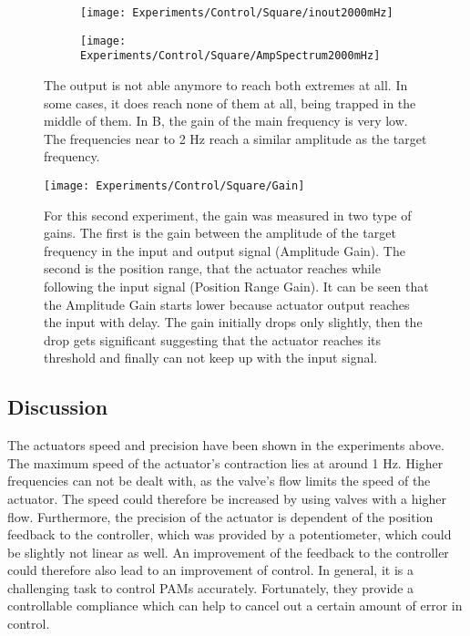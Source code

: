 \documentclass[main]{subfiles}
\begin{document}
\begin{figure}[H]
\begin{adjustwidth}{-8em}{-3em}
\begin{subfigure}[t]{0.665\textwidth}
\texttt{[image: Experiments/Control/Square/inout2000mHz]}
\end{subfigure}\hspace{0.05\textwidth}
\begin{subfigure}[t]{0.6\textwidth}
\texttt{[image: Experiments/Control/Square/AmpSpectrum2000mHz]}
\end{subfigure}
\end{adjustwidth}


\caption[Square wave control signal at 2 Hz]{The output is not able anymore to reach both extremes at all. In some cases, it does reach none of them at all, being trapped in the middle of them. In B, the gain of the main frequency is very low. The frequencies near to 2 Hz reach a similar amplitude as the target frequency.}
\label{sq-2000mHz}
\end{figure}

\begin{figure}[H]
\centering
\texttt{[image: Experiments/Control/Square/Gain]}
\caption[Gain drop in frequency response of square wave signals]{For this second experiment, the gain was measured in two type of gains. The first is the gain between the amplitude of the target frequency in the input and output signal (Amplitude Gain). The second is the position range, that the actuator reaches while following the input signal (Position Range Gain). It can be seen that the Amplitude Gain starts lower because actuator output reaches the input with delay. The gain initially drops only slightly, then the drop gets significant suggesting that the actuator reaches its threshold and finally can not keep up with the input signal.}
\label{sq-gain}
\end{figure}

\subsection{Discussion}

The actuators speed and precision have been shown in the experiments above. The maximum speed of the actuator's contraction lies at around 1 Hz. Higher frequencies can not be dealt with, as the valve's flow limits the speed of the actuator. The speed could therefore be increased by using valves with a higher flow. Furthermore, the precision of the actuator is dependent of the position feedback to the controller, which was provided by a potentiometer, which could be slightly not linear as well. An improvement of the feedback to the controller could therefore also lead to an improvement of control. In general, it is a challenging task to control PAMs accurately. Fortunately, they provide a controllable compliance which can help to cancel out a certain amount of error in control. 
\end{document}
